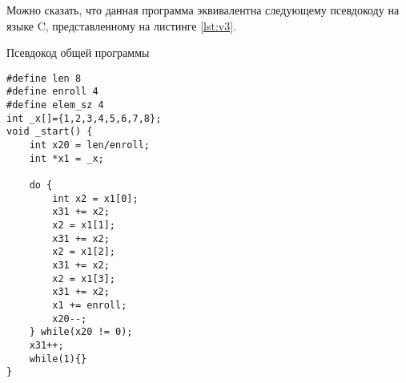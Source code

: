 \clearpage

Можно сказать, что данная программа эквивалентна следующему псевдокоду на языке C, представленному на листинге \ref{lst:v3}.

\begin{code}
\caption{Псевдокод общей программы}
\label{lst:v3}

\begin{verbatim}
#define len 8
#define enroll 4
#define elem_sz 4
int _x[]={1,2,3,4,5,6,7,8};
void _start() {
	int x20 = len/enroll;
	int *x1 = _x;
	
	do {
		int x2 = x1[0];
		x31 += x2;
		x2 = x1[1];
		x31 += x2;
		x2 = x1[2];
		x31 += x2;
		x2 = x1[3];
		x31 += x2;
		x1 += enroll;
		x20--;
	} while(x20 != 0);
	x31++;
	while(1){}
}
\end{verbatim}
\end{code}

\newpage
{}


